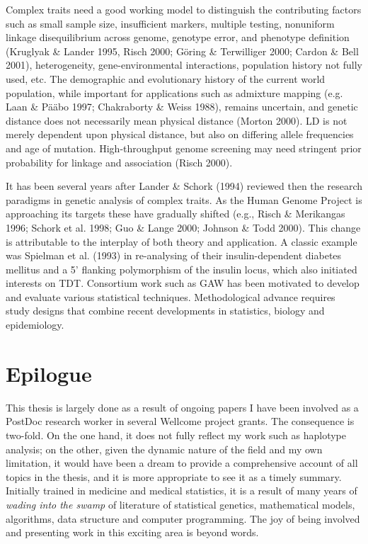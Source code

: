 Complex traits need a good working model to distinguish the contributing
factors such as small sample size, insufficient markers, multiple testing,
nonuniform linkage disequilibrium across genome, genotype error, and phenotype
definition (Kruglyak \& Lander 1995, Risch 2000; G\"{o}ring \& Terwilliger
2000; Cardon \& Bell 2001), heterogeneity, gene-environmental interactions,
population history not fully used, etc.  The demographic and evolutionary
history of the current world population, while important for applications such
as admixture mapping (e.g.  Laan \& P\"{a}\"{a}bo 1997; Chakraborty \& Weiss
1988), remains uncertain, and genetic distance does not necessarily mean
physical distance (Morton 2000).  LD is not merely dependent upon physical
distance, but also on differing allele frequencies and age of mutation.
High-throughput genome screening may need stringent prior probability for
linkage and association (Risch 2000).

It has been several years after Lander \& Schork (1994) reviewed then the
research paradigms in genetic analysis of complex traits.  As the Human Genome
Project is approaching its targets these have gradually shifted (e.g., Risch \&
Merikangas 1996; Schork et al.  1998; Guo \& Lange 2000; Johnson \& Todd 2000).
This change is attributable to the interplay of both theory and application.  A
classic example was Spielman et al.  (1993) in re-analysing of their
insulin-dependent diabetes mellitus and a 5' flanking polymorphism of the
insulin locus, which also initiated interests on TDT.  Consortium work such as
GAW has been motivated to develop and evaluate various statistical techniques.
Methodological advance requires study designs that combine recent developments
in statistics, biology and epidemiology.


\section{Epilogue}

This thesis is largely done as a result of ongoing papers I have been involved
as a PostDoc research worker in several Wellcome project grants.  The
consequence is two-fold.  On the one hand, it does not fully reflect my work
such as haplotype analysis; on the other, given the dynamic nature of the field
and my own limitation, it would have been a dream to provide a comprehensive
account of all topics in the thesis, and it is more appropriate to see it as a
timely summary.  Initially trained in medicine and medical statistics, it is a
result of many years of {\em wading into the swamp} of literature of
statistical genetics, mathematical models, algorithms, data structure and
computer programming.  The joy of being involved and presenting work in this
exciting area is beyond words.
